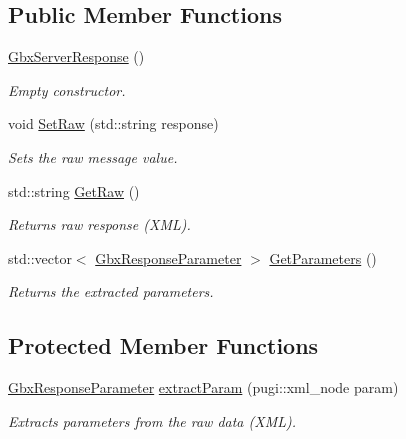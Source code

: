 \subsection*{Public Member Functions}
\begin{DoxyCompactItemize}
\item 
\hypertarget{classGbxServerResponse_a2198b6f6ca6b7da1ffd7bfa9a516d8b2}{\hyperlink{classGbxServerResponse_a2198b6f6ca6b7da1ffd7bfa9a516d8b2}{Gbx\-Server\-Response} ()}\label{classGbxServerResponse_a2198b6f6ca6b7da1ffd7bfa9a516d8b2}

\begin{DoxyCompactList}\small\item\em Empty constructor. \end{DoxyCompactList}\item 
void \hyperlink{classGbxServerResponse_a178871bec787d490f69def87f0242e05}{Set\-Raw} (std\-::string response)
\begin{DoxyCompactList}\small\item\em Sets the raw message value. \end{DoxyCompactList}\item 
\hypertarget{classGbxServerResponse_aa449d9a63899e1d1205e6ab916798ba6}{std\-::string \hyperlink{classGbxServerResponse_aa449d9a63899e1d1205e6ab916798ba6}{Get\-Raw} ()}\label{classGbxServerResponse_aa449d9a63899e1d1205e6ab916798ba6}

\begin{DoxyCompactList}\small\item\em Returns raw response (X\-M\-L). \end{DoxyCompactList}\item 
\hypertarget{classGbxServerResponse_a6d42bdaaeff3368e1fab2984940d2a2c}{std\-::vector$<$ \hyperlink{classGbxResponseParameter}{Gbx\-Response\-Parameter} $>$ \hyperlink{classGbxServerResponse_a6d42bdaaeff3368e1fab2984940d2a2c}{Get\-Parameters} ()}\label{classGbxServerResponse_a6d42bdaaeff3368e1fab2984940d2a2c}

\begin{DoxyCompactList}\small\item\em Returns the extracted parameters. \end{DoxyCompactList}\end{DoxyCompactItemize}
\subsection*{Protected Member Functions}
\begin{DoxyCompactItemize}
\item 
\hypertarget{classGbxServerResponse_a22433a652ce9d4c7e9b834aa60c93c37}{\hyperlink{classGbxResponseParameter}{Gbx\-Response\-Parameter} \hyperlink{classGbxServerResponse_a22433a652ce9d4c7e9b834aa60c93c37}{extract\-Param} (pugi\-::xml\-\_\-node param)}\label{classGbxServerResponse_a22433a652ce9d4c7e9b834aa60c93c37}

\begin{DoxyCompactList}\small\item\em Extracts parameters from the raw data (X\-M\-L). \end{DoxyCompactList}\end{DoxyCompactItemize}
